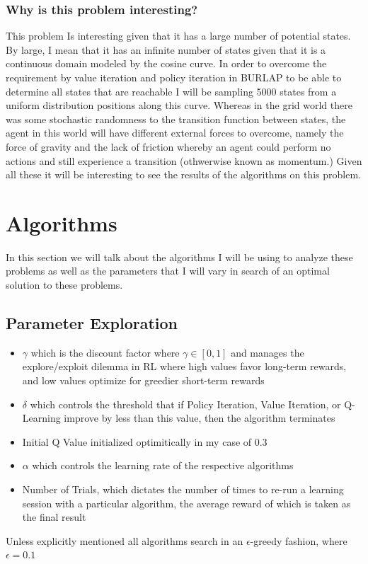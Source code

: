\documentclass[11pt]{article}
\begin{document}
    \subsubsection{Why is this problem interesting?}
    This problem Is interesting given that it has a large number of potential states.
    By large, I mean that it has an infinite number of states given that it is a continuous domain modeled by the cosine curve.
    In order to overcome the requirement by value iteration and policy iteration in BURLAP to be able to determine all
    states that are reachable I will be sampling 5000 states from a uniform distribution positions along this curve.
    Whereas in the grid world there was some stochastic randomness to the transition function between states, the agent
    in this world will have different external forces to overcome, namely the force of gravity and the lack of friction
    whereby an agent could perform no actions and still experience a transition (othwerwise known as momentum.)
    Given all these it will be interesting to see the results of the algorithms on this problem.


    \section{Algorithms}
    In this section we will talk about the algorithms I will be using to analyze these problems as well as the parameters
    that I will vary in search of an optimal solution to these problems.

    \subsection{Parameter Exploration}
    \begin{itemize}
        \item $\gamma$ which is the discount factor where $\gamma \in [0,1]$ and manages the explore/exploit dilemma in RL where high values favor long-term rewards, and low values optimize for greedier short-term rewards
        \item $\delta$ which controls the threshold that if Policy Iteration, Value Iteration, or Q-Learning improve by less than this value, then the algorithm terminates
        \item Initial Q Value initialized optimitically in my case of 0.3
        \item $\alpha$ which controls the learning rate of the respective algorithms
        \item Number of Trials, which dictates the number of times to re-run a learning session with a particular algorithm, the average reward of which is taken as the final result
    \end{itemize}
    Unless explicitly mentioned all algorithms search in an $\epsilon$-greedy fashion, where $\epsilon = 0.1$
\end{document}
